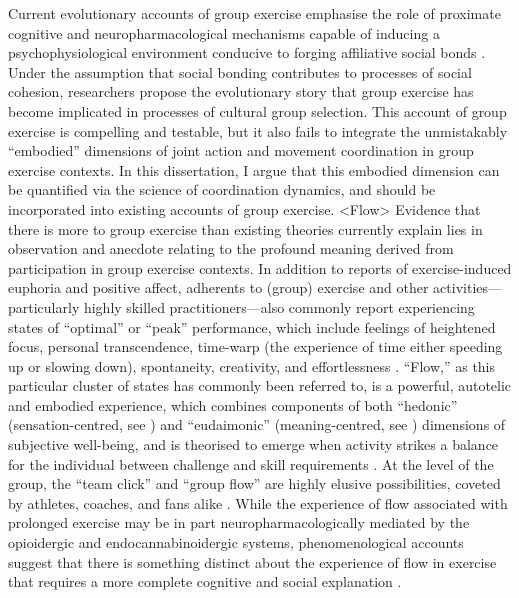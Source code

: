 Current evolutionary accounts of group exercise emphasise the role of proximate cognitive and neuropharmacological mechanisms capable of inducing a psychophysiological environment conducive to forging affiliative social bonds \citep{Dunbar2010,Cohen2017}. Under the assumption that social bonding contributes to processes of social cohesion, researchers propose the evolutionary story that group exercise has become implicated in processes of cultural group selection.  This account of group exercise is compelling and testable, but it also fails to integrate the unmistakably ``embodied'' dimensions of joint action and movement coordination in group exercise contexts.  In this dissertation, I argue that this embodied dimension can be quantified via the science of coordination dynamics, and should be incorporated into existing accounts of group exercise.
<Flow>
Evidence that there is more to group exercise than existing theories currently explain lies in observation and anecdote relating to the profound meaning derived from participation in group exercise contexts.  In addition to reports of exercise-induced euphoria and positive affect, adherents to (group) exercise and other activities---particularly highly skilled practitioners---also commonly report experiencing states of ``optimal'' or ``peak'' performance, which include feelings of heightened focus, personal transcendence, time-warp (the experience of time either speeding up or slowing down), spontaneity, creativity, and effortlessness \citep{Jackson1995a}.  ``Flow,'' as this particular cluster of states has commonly been referred to, is a powerful, autotelic and embodied experience, which combines components of both ``hedonic'' (sensation-centred, see \citep{Huta2010}) and ``eudaimonic'' (meaning-centred, see \cite{Ryff1989,Ryff2015}) dimensions of subjective well-being, and is theorised to emerge when activity strikes a balance for the individual between challenge and skill requirements \citep{Csikszentmihalyi1990,Abuhamdeh2012}.  At the level of the group, the ``team click'' and ``group flow'' are highly elusive possibilities, coveted by athletes, coaches, and fans alike \citep{Novak1993,Sawyer2006}.  While the experience of flow associated with prolonged exercise may be in part neuropharmacologically mediated by the opioidergic and endocannabinoidergic systems, phenomenological accounts suggest that there is something distinct about the experience of flow in exercise that requires a more complete cognitive and social explanation \citep{Dietrich2006,Dietrich2011}.

